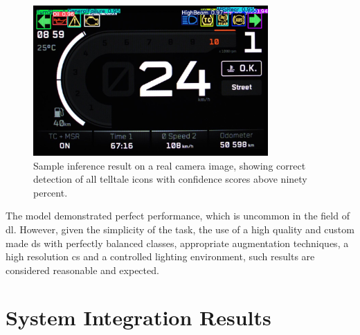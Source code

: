 \begin{figure}[!ht]
    \centering
    \includegraphics[width=0.8\textwidth]{Figures/Results/Graphs/Test/8_bmp.rf.8110c0e7d7a1723405054135cabc6cbf.jpg}
    \caption{Sample inference result on a real camera image, showing correct detection of all telltale icons with confidence scores above ninety percent.}
    \label{fig:Sample_CI}
\end{figure}

The model demonstrated perfect performance, which is uncommon in the field of \gls{dl}. However, given the simplicity of the task, the use of a high quality and custom made \gls{ds} with perfectly balanced classes, appropriate augmentation techniques, a high resolution \gls{cs} and a controlled lighting environment, such results are considered reasonable and expected.


\section{System Integration Results}
